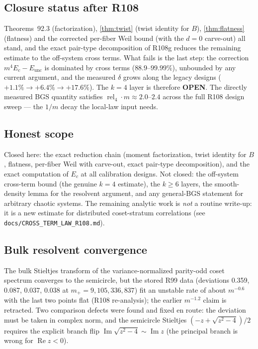 \subsection{Closure status after R108}

\begin{corollary}[H3 at $k = 4$; DOWNGRADED to open in R108]
\label{cor:h3closed}
Theorems~92.3 (factorization), \ref{thm:twist} (twist identity for
$B$), \ref{thm:flatness} (flatness) and the corrected per-fiber Weil
bound (with the $d{=}0$ carve-out) all stand, and the exact pair-type
decomposition of R108g reduces the remaining estimate to the
off-system cross terms.  What fails is the last step: the correction
$m^4 E_c - E_{\mathrm{unc}}$ is dominated by cross terms
($88.9$--$99.99\%$), unbounded by any current argument, and the
measured $\delta$ grows along the legacy designs
($+1.1\% \to +6.4\% \to +17.6\%$).  The $k{=}4$ layer is therefore
\textbf{OPEN}.  The directly measured BGS quantity satisfies
$\operatorname{rel}_4 \cdot m \approx 2.0$--$2.4$ across the full
R108 design sweep --- the $1/m$ decay the local-law input needs.
\end{corollary}

\subsection{Honest scope}

Closed here: the exact reduction chain (moment factorization, twist
identity for $B$, flatness, per-fiber Weil with carve-out, exact
pair-type decomposition), and the exact computation of $E_c$ at all
calibration designs.  Not closed: the off-system cross-term bound (the
genuine $k{=}4$ estimate), the $k \ge 6$ layers, the smooth-density
lemma for the resolvent argument, and any general-BGS statement for
arbitrary chaotic systems.  The remaining analytic work is \emph{not}
a routine write-up: it is a new estimate for distributed coset-stratum
correlations (see \texttt{docs/CROSS\_TERM\_LAW\_R108.md}).

\subsection{Bulk resolvent convergence}
\label{sec:resolvent}

The bulk Stieltjes transform of the variance-normalized parity-odd
coset spectrum converges to the semicircle, but the stored R99 data (deviations 0.359, 0.087, 0.037, 0.038 at $m_+ = 9, 105, 336, 837$) fit an unstable rate of about $m^{-0.6}$ with the last two points flat (R108 re-analysis); the earlier $m^{-1.2}$ claim is retracted.  Two
comparison defects were found and fixed en route: the deviation must
be taken in complex norm, and the semicircle Stieltjes
$(-z + \sqrt{z^2-4})/2$ requires the explicit branch flip
$\operatorname{Im}\sqrt{z^2-4} \sim \operatorname{Im} z$ (the
principal branch is wrong for $\operatorname{Re} z < 0$).

